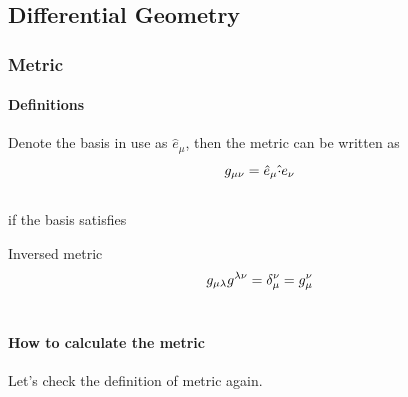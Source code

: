 \documentclass[letterpaper,10pt,english]{sphinxmanual}
\begin{document}
\subsection{Differential Geometry}
\label{math:differential-geometry}

\subsubsection{Metric}
\label{math:metric}

\paragraph{Definitions}
\label{math:definitions}
Denote the basis in use as $\hat e_\mu$, then the metric can be written as
\begin{gather}
\begin{split}g_{\mu\nu}=\hat e_\mu \hat \cdot e_\nu\end{split}\notag\\\begin{split}\end{split}\notag
\end{gather}
if the basis satisfies

Inversed metric
\begin{gather}
\begin{split}g_{\mu\lambda}g^{\lambda\nu}=\delta_\mu^\nu = g_\mu^\nu\end{split}\notag\\\begin{split}\end{split}\notag
\end{gather}

\paragraph{How to calculate the metric}
\label{math:how-to-calculate-the-metric}
Let's check the definition of metric again.
\end{document}
